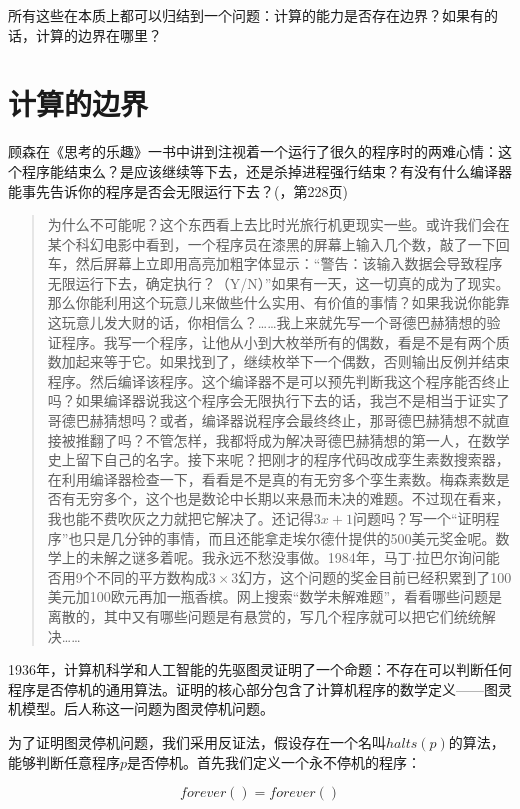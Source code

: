 \documentclass[b5paper]{ctexart}
\begin{document}
所有这些在本质上都可以归结到一个问题：计算的能力是否存在边界？如果有的话，计算的边界在哪里？

\section{计算的边界}

顾森在《思考的乐趣》一书中讲到注视着一个运行了很久的程序时的两难心情：这个程序能结束么？是应该继续等下去，还是杀掉进程强行结束？有没有什么编译器能事先告诉你的程序是否会无限运行下去？(\cite{GuSen-2012}，第228页)

\begin{quotation}
为什么不可能呢？这个东西看上去比时光旅行机更现实一些。或许我们会在某个科幻电影中看到，一个程序员在漆黑的屏幕上输入几个数，敲了一下回车，然后屏幕上立即用高亮加粗字体显示：“警告：该输入数据会导致程序无限运行下去，确定执行？（Y/N）”如果有一天，这一切真的成为了现实。那么你能利用这个玩意儿来做些什么实用、有价值的事情？如果我说你能靠这玩意儿发大财的话，你相信么？……我上来就先写一个哥德巴赫猜想的验证程序。我写一个程序，让他从小到大枚举所有的偶数，看是不是有两个质数加起来等于它。如果找到了，继续枚举下一个偶数，否则输出反例并结束程序。然后编译该程序。这个编译器不是可以预先判断我这个程序能否终止吗？如果编译器说我这个程序会无限执行下去的话，我岂不是相当于证实了哥德巴赫猜想吗？或者，编译器说程序会最终终止，那哥德巴赫猜想不就直接被推翻了吗？不管怎样，我都将成为解决哥德巴赫猜想的第一人，在数学史上留下自己的名字。接下来呢？把刚才的程序代码改成孪生素数搜索器，在利用编译器检查一下，看看是不是真的有无穷多个孪生素数。梅森素数是否有无穷多个，这个也是数论中长期以来悬而未决的难题。不过现在看来，我也能不费吹灰之力就把它解决了。还记得$3x+1$问题吗？写一个“证明程序”也只是几分钟的事情，而且还能拿走埃尔德什提供的500美元奖金呢。数学上的未解之谜多着呢。我永远不愁没事做。1984年，马丁$\cdot$拉巴尔询问能否用9个不同的平方数构成$3 \times 3$幻方，这个问题的奖金目前已经积累到了100美元加100欧元再加一瓶香槟。网上搜索“数学未解难题”，看看哪些问题是离散的，其中又有哪些问题是有悬赏的，写几个程序就可以把它们统统解决……
\end{quotation}

1936年，计算机科学和人工智能的先驱图灵证明了一个命题：不存在可以判断任何程序是否停机的通用算法。证明的核心部分包含了计算机程序的数学定义——图灵机模型。后人称这一问题为图灵停机问题。

为了证明图灵停机问题，我们采用反证法，假设存在一个名叫$halts(p)$的算法，能够判断任意程序$p$是否停机。首先我们定义一个永不停机的程序：

\[
forever() = forever()
\]
\end{document}
